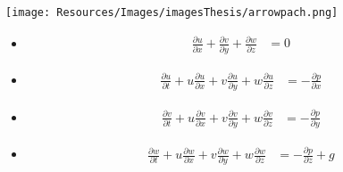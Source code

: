 \begin{frame}
    \vspace{2cm}
\centering
\texttt{[image: Resources/Images/imagesThesis/arrowpach.png]}
\end{frame}



\begin{frame}
\begin{minipage}{0.35\textwidth}
\begin{itemize}
\item<1->[]
\begin{align*}
\frac{\partial u}{\partial x} + \frac{\partial v}{\partial y} + \frac{\partial w}{\partial z} &= 0
\end{align*}
\item<1->[]
\begin{align*}
\frac{\partial u}{\partial t} + u\frac{\partial u}{\partial x} + v\frac{\partial u}{\partial y} + w\frac{\partial u}{\partial z} &= - \frac{\partial p}{\partial x}
\end{align*}
\item<1->[]
\begin{align*}
\frac{\partial v}{\partial t} + u\frac{\partial v}{\partial x} + v\frac{\partial v}{\partial y} + w\frac{\partial v}{\partial z}&= - \frac{\partial p}{\partial y}
\end{align*}
\item<1->[]
\begin{align*}
\frac{\partial w}{\partial t} + u\frac{\partial w}{\partial x} + v\frac{\partial w}{\partial y} + w\frac{\partial w}{\partial z} &= - \frac{\partial p}{\partial z} + g \end{align*}
\end{itemize}
\end{minipage}
\end{frame}
\clearpage


